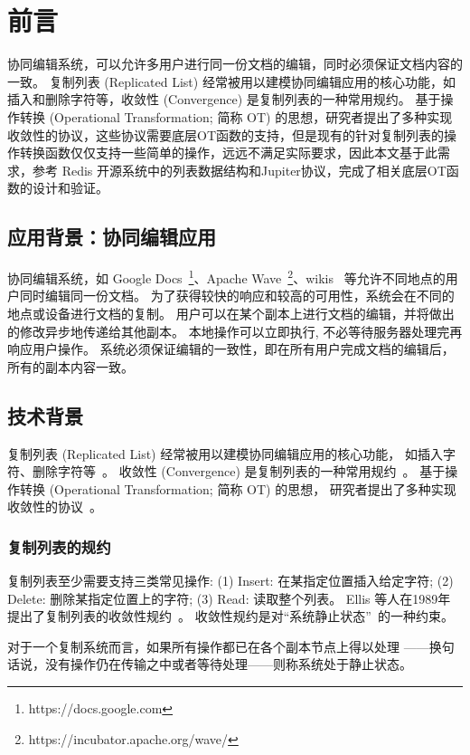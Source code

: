 \chapter{前言}
协同编辑系统，可以允许多用户进行同一份文档的编辑，同时必须保证文档内容的一致。
复制列表 (Replicated List) 经常被用以建模协同编辑应用的核心功能，如插入和删除字符等，收敛性 (Convergence) 是复制列表的一种常用规约。
基于操作转换 (Operational Transformation; 简称 OT) 的思想，研究者提出了多种实现收敛性的协议，这些协议需要底层OT函数的支持，但是现有的针对复制列表的操作转换函数仅仅支持一些简单的操作，远远不满足实际要求，因此本文基于此需求，参考 Redis 开源系统中的列表数据结构和Jupiter协议，完成了相关底层OT函数的设计和验证。


\section{应用背景：协同编辑应用}

协同编辑系统，如 Google Docs~\footnote{https://docs.google.com}、Apache Wave~\footnote{https://incubator.apache.org/wave/}、wikis~\cite{Leuf:Wiki01} 
等允许不同地点的用户同时编辑同一份文档。
为了获得较快的响应和较高的可用性，系统会在不同的地点或设备进行文档的复制。
用户可以在某个副本上进行文档的编辑，并将做出的修改异步地传递给其他副本。
本地操作可以立即执行, 不必等待服务器处理完再响应用户操作。
系统必须保证编辑的一致性，即在所有用户完成文档的编辑后，所有的副本内容一致。

\section{技术背景}

复制列表 (Replicated List) 经常被用以建模协同编辑应用的核心功能，
如插入字符、删除字符等~\cite{Ellis:SIGMOD89, Nichols:UIST95, Attiya:PODC16}。
收敛性 (Convergence) 是复制列表的一种常用规约~\cite{Ellis:SIGMOD89}。
基于操作转换 (Operational Transformation; 简称 OT) 的思想，
研究者提出了多种实现收敛性的协议~\cite{Ellis:SIGMOD89, Prakash:TOCHI94, Nichols:UIST95, Sun:TOCHI98, Sun:CSCW98, 
Vidot:CSCW00, Shen:CSCW02, Sun:TOCHI02, Li:ICPADS04, Sun:TPDS09, Sun:CSCW14}。

\subsection{复制列表的规约}
复制列表至少需要支持三类常见操作: 
(1) Insert: 在某指定位置插入给定字符;
(2) Delete: 删除某指定位置上的字符;
(3) Read: 读取整个列表。
%
Ellis 等人在1989年提出了复制列表的收敛性规约~\cite{Ellis:SIGMOD89}。
收敛性规约是对``系统静止状态''~\cite{Ellis:SIGMOD89}的一种约束。
\begin{definition}
  对于一个复制系统而言，如果所有操作都已在各个副本节点上得以处理
  ——换句话说，没有操作仍在传输之中或者等待处理——则称系统处于静止状态。
\end{definition}

